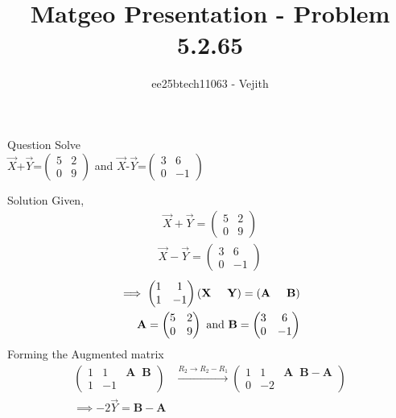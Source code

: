 \documentclass{beamer}
\title{Matgeo Presentation - Problem 5.2.65}
\author{ee25btech11063 - Vejith}
\numberwithin{equation}{section}
\providecommand{\brak}[1]{\ensuremath{\left(#1\right)}}
\theoremstyle{remark}
\let\vec\mathbf
\begin{document}
\frame{\titlepage}
\begin{frame}{Question}
Solve\\
$\Vec{X}$+$\Vec{Y}$=$\begin{pmatrix}
    5 & 2\\
    0 & 9
\end{pmatrix}$ and $\Vec{X}$-$\Vec{Y}$=$\begin{pmatrix}
    3 & 6\\
    0 & -1
\end{pmatrix}$
\end{frame}

\begin{frame}{Solution}
Given,
\begin{align}
    \Vec{X}+\Vec{Y}=\begin{pmatrix}
    5 & 2\\
    0 & 9
    \end{pmatrix}
\end{align}
\begin{align}
    \Vec{X}-\Vec{Y}=\begin{pmatrix}
    3 & 6\\
    0 & -1
\end{pmatrix}
\end{align}
\begin{align}
    \implies \begin{pmatrix}
        1 & 1\\
         1 & -1
    \end{pmatrix} \brak{\vec{X}\hspace{0.5cm}\vec{Y}}=\brak{\vec{A}\hspace{0.5cm}\vec{B}}\\
     \vec{A}= \begin{pmatrix}
    5 & 2\\
    0 & 9
\end{pmatrix} \text{ and } \vec{B}=\begin{pmatrix}
    3 & 6\\
    0 & -1
\end{pmatrix}
    \end{align}
Forming the Augmented matrix
\begin{align}
\left(
\begin{array}{cc|c}
1 & 1 & \vec{A} \;\; \vec{B} \\
1 & -1 &
\end{array}
\right)  &\xrightarrow{R_2 \rightarrow R_2-R_1} \left(
\begin{array}{cc|c}
1 & 1 & \vec{A} \;\; \vec{B-A} \\
0 & -2 &
\end{array}
\right)\\
\implies -2\Vec{Y}=\vec{B-A}
\end{align}
\end{frame}
\end{document}
